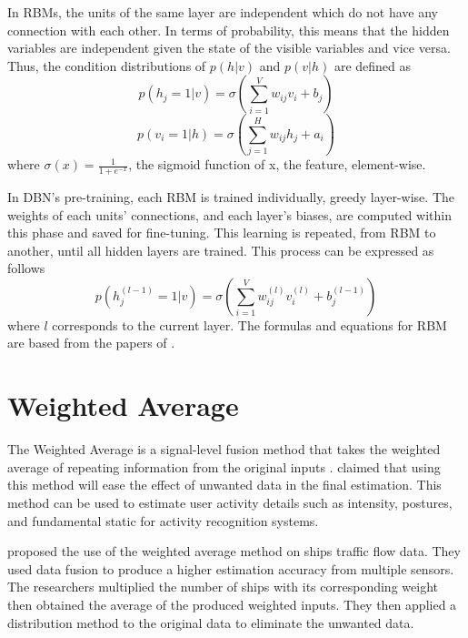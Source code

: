 In RBMs, the units of the same layer are independent which do not have any connection with each other. In terms of probability, this means that the hidden variables are independent given the state of the visible variables and vice versa. Thus, the condition distributions of $p(h|v)$ and $p(v|h)$ are defined as
\begin{equation}\label{eq:4}
p(h_j = 1 | v) = \sigma\left( \sum^V_{i=1} w_{ij}v_i + b_j \right)
\end{equation}
\begin{equation}\label{eq:5}
p(v_i = 1 | h) = \sigma\left( \sum^H_{j=1} w_{ij}h_j + a_i \right)
\end{equation}
\noindent where $\sigma(x) = \frac{1}{1 + e^{-x}}$, the sigmoid function of x, the feature, element-wise.

In DBN’s pre-training, each RBM is trained individually, greedy layer-wise. The weights of each units’ connections, and each layer’s biases, are computed within this phase and saved for fine-tuning. This learning is repeated, from RBM to another, until all hidden layers are trained. This process can be expressed as follows 
\begin{equation}\label{eq:6}
p(h_j^{(l-1)} = 1 | v) = \sigma( \sum^V_{i=1} w_{ij}^{(l)}v_i^{(l)} + b_j^{(l-1)} )
\end{equation}
\noindent where $l$ corresponds to the current layer. 
The formulas and equations for RBM are based from the papers of . 


\section{Weighted Average}
The Weighted Average is a signal-level fusion method that takes the weighted average of repeating information from the original inputs .  claimed that using this method will ease the effect of unwanted data in the final estimation. This method can be used to estimate user activity details such as intensity, postures, and fundamental static for activity recognition systems. 

 proposed the use of the weighted average method on ships traffic flow data. They used data fusion to produce a higher estimation accuracy from multiple sensors. The researchers multiplied the number of ships with its corresponding weight then obtained the average of the produced weighted inputs. They then applied a distribution method to the original data to eliminate the unwanted data. 


